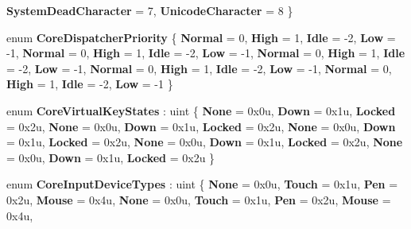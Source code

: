 \begin{DoxyCompactItemize}
{\bfseries System\+Dead\+Character} = 7, 
\newline
{\bfseries Unicode\+Character} = 8
 \}
\item 
\mbox{\label{namespace_windows_1_1_u_i_1_1_core_a612646cf897e13d073df58cbf255fea7}} 
enum {\bfseries Core\+Dispatcher\+Priority} \{ \newline
{\bfseries Normal} = 0, 
{\bfseries High} = 1, 
{\bfseries Idle} = -\/2, 
{\bfseries Low} = -\/1, 
\newline
{\bfseries Normal} = 0, 
{\bfseries High} = 1, 
{\bfseries Idle} = -\/2, 
{\bfseries Low} = -\/1, 
\newline
{\bfseries Normal} = 0, 
{\bfseries High} = 1, 
{\bfseries Idle} = -\/2, 
{\bfseries Low} = -\/1, 
\newline
{\bfseries Normal} = 0, 
{\bfseries High} = 1, 
{\bfseries Idle} = -\/2, 
{\bfseries Low} = -\/1, 
\newline
{\bfseries Normal} = 0, 
{\bfseries High} = 1, 
{\bfseries Idle} = -\/2, 
{\bfseries Low} = -\/1
 \}
\item 
\mbox{\label{namespace_windows_1_1_u_i_1_1_core_aa71ac02d1eeaccb86184a016581721ab}} 
enum {\bfseries Core\+Virtual\+Key\+States} \+: uint \{ \newline
{\bfseries None} = 0x0u, 
{\bfseries Down} = 0x1u, 
{\bfseries Locked} = 0x2u, 
{\bfseries None} = 0x0u, 
\newline
{\bfseries Down} = 0x1u, 
{\bfseries Locked} = 0x2u, 
{\bfseries None} = 0x0u, 
{\bfseries Down} = 0x1u, 
\newline
{\bfseries Locked} = 0x2u, 
{\bfseries None} = 0x0u, 
{\bfseries Down} = 0x1u, 
{\bfseries Locked} = 0x2u, 
\newline
{\bfseries None} = 0x0u, 
{\bfseries Down} = 0x1u, 
{\bfseries Locked} = 0x2u
 \}
\item 
\mbox{\label{namespace_windows_1_1_u_i_1_1_core_a77ab8ebe40609e15ad86f2c13a357af6}} 
enum {\bfseries Core\+Input\+Device\+Types} \+: uint \{ \newline
{\bfseries None} = 0x0u, 
{\bfseries Touch} = 0x1u, 
{\bfseries Pen} = 0x2u, 
{\bfseries Mouse} = 0x4u, 
\newline
{\bfseries None} = 0x0u, 
{\bfseries Touch} = 0x1u, 
{\bfseries Pen} = 0x2u, 
{\bfseries Mouse} = 0x4u, 
\newline

\end{DoxyCompactItemize}
